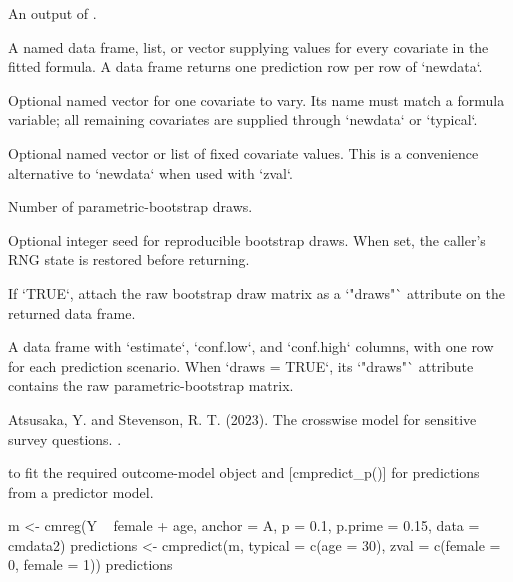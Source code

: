 \documentclass[a4paper]{book}
\begin{document}
\begin{Arguments}
\begin{ldescription}
\item[\code{out}] An output of .

\item[\code{newdata}] A named data frame, list, or vector supplying values for every
covariate in the fitted formula. A data frame returns one prediction row per
row of `newdata`.

\item[\code{zval}] Optional named vector for one covariate to vary. Its name must
match a formula variable; all remaining covariates are supplied through
`newdata` or `typical`.

\item[\code{typical}] Optional named vector or list of fixed covariate values. This
is a convenience alternative to `newdata` when used with `zval`.

\item[\code{nsim}] Number of parametric-bootstrap draws.

\item[\code{seed}] Optional integer seed for reproducible bootstrap draws. When set,
the caller's RNG state is restored before returning.

\item[\code{draws}] If `TRUE`, attach the raw bootstrap draw matrix as a `"draws"`
attribute on the returned data frame.
\end{ldescription}
\end{Arguments}
%
\begin{Value}
A data frame with `estimate`, `conf.low`, and `conf.high` columns,
with one row for each prediction scenario. When `draws = TRUE`, its `"draws"`
attribute contains the raw parametric-bootstrap matrix.
\end{Value}
%
\begin{References}
Atsusaka, Y. and Stevenson, R. T. (2023). The crosswise model
for sensitive survey questions. .
\end{References}
%
\begin{SeeAlso}
[cmreg()] to fit the required outcome-model object and
[cmpredict\_p()] for predictions from a predictor model.
\end{SeeAlso}
%
\begin{Examples}
\begin{ExampleCode}
m <- cmreg(Y ~ female + age, anchor = A, p = 0.1, p.prime = 0.15,
           data = cmdata2)
predictions <- cmpredict(m, typical = c(age = 30),
                          zval = c(female = 0, female = 1))
predictions
\end{ExampleCode}
\end{Examples}
\end{document}
